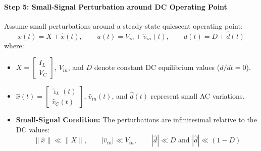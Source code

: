 \paragraph{Step 5: Small-Signal Perturbation around DC Operating Point}
Assume small perturbations around a steady-state quiescent operating point:
\begin{equation}
x(t) = X + \hat{x}(t), \qquad u(t) = V_{in} + \hat{v}_{in}(t), \qquad d(t) = D + \hat{d}(t)
\end{equation}
where:
\begin{itemize}
  \item $X = \begin{bmatrix} I_L \\ V_C \end{bmatrix}$, $V_{in}$, and $D$ denote constant DC equilibrium values ($d/dt = 0$).
  \item $\hat{x}(t) = \begin{bmatrix} \hat{\imath}_L(t) \\ \hat{v}_C(t) \end{bmatrix}$, $\hat{v}_{in}(t)$, and $\hat{d}(t)$ represent small AC variations.
  \item \textbf{Small-Signal Condition:} The perturbations are infinitesimal relative to the DC values:
  \begin{equation}
  \|\hat{x}\| \ll \|X\|, \qquad |\hat{v}_{in}| \ll V_{in}, \qquad |\hat{d}| \ll D \text{ and } |\hat{d}| \ll (1 - D)
  \end{equation}
\end{itemize}

